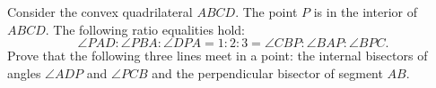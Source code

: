 Consider the convex quadrilateral $ABCD$. The point $P$ is in the interior of $ABCD$. The following ratio equalities hold:
\[
	\angle{PAD}:\angle{PBA}:\angle{DPA}=1:2:3=\angle{CBP}:\angle{BAP}:\angle{BPC}.
\]
Prove that the following three lines meet in a point: the internal bisectors of angles $\angle{ADP}$ and $\angle{PCB}$ and the perpendicular bisector of segment $AB$.
